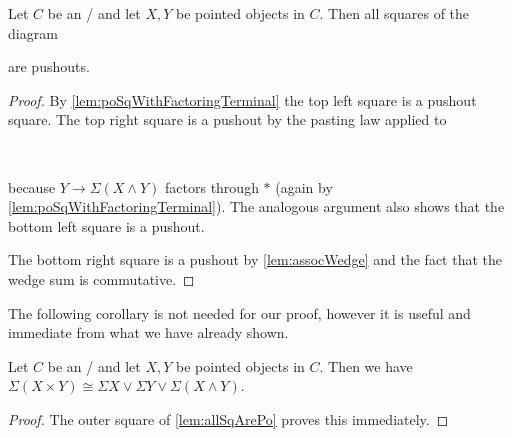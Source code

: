 \begin{lemma}\label{lem:allSqArePo}
    Let $C$ be an \inftytop/ and let $X,Y$ be pointed objects in $C$. 
    Then all squares of the diagram         
    \begin{center}
    \end{center}
    are pushouts.
    \begin{proof}
        By \cref{lem:poSqWithFactoringTerminal} the top left square is a pushout square.
        The top right square is a pushout by the pasting law applied to
        \begin{center}
            \
        \end{center}
        because $Y\to\Sigma\left(X\wedge Y\right)$ factors through $*$ (again by \cref{lem:poSqWithFactoringTerminal}).
        The analogous argument also shows that the bottom left square is a pushout.

        The bottom right square is a pushout by \cref{lem:assocWedge} and the fact that the wedge sum is commutative.
    \end{proof}
\end{lemma}
The following corollary is not needed for our proof, however it is useful and immediate from what we have already shown.
\begin{corollary}
    Let $C$ be an \inftytop/ and let $X,Y$ be pointed objects in $C$. 
    Then we have $\Sigma\left(X\times Y\right)\cong\Sigma X\vee\Sigma Y\vee\Sigma\left(X\wedge Y\right)$.
    \begin{proof}
        The outer square of \cref{lem:allSqArePo} proves this immediately. 
    \end{proof}
\end{corollary}
